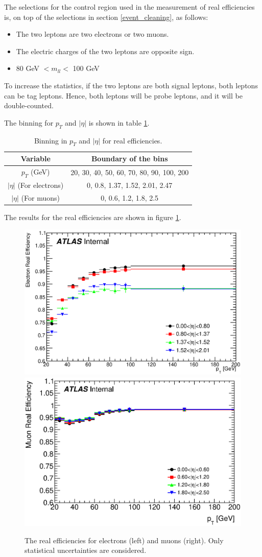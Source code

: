 The selections for the control region used in the measurement of real efficiencies is, on top of the selections in section \ref{event_cleaning}, as follows:
\begin{itemize}
\item The two leptons are two electrons or two muons.
\item The electric charges of the two leptons are opposite sign.
\item 80 GeV $< m_{ll} <$ 100 GeV
\end{itemize}

To increase the statistics, if the two leptons are both signal leptons, both leptons can be tag leptons.
Hence, both leptons will be probe leptons, and it will be double-counted.

The binning for $p_T$ and $|\eta|$ is shown in table \ref{tab:binning_real_eff}.
\begin{table}[htbp]
\centering
\begin{tabular}{|c|c|}
\hline
Variable & Boundary of the bins \\
\hline
$p_T$ (GeV) &  20, 30, 40, 50, 60, 70, 80, 90, 100, 200 \\
\hline
$|\eta|$ (For electrons) & 0, 0.8, 1.37, 1.52, 2.01, 2.47 \\
\hline
$|\eta|$ (For muons) & 0, 0.6, 1.2, 1.8, 2.5 \\
\hline
\end{tabular}
\caption{Binning in $p_T$ and $|\eta|$ for real efficiencies.}
\label{tab:binning_real_eff}
\end{table}

The results for the real efficiencies are shown in figure \ref{fig:result_real_eff}.
\begin{figure}[htpb]
\centering
\includegraphics[width=0.49\linewidth]{data/plot/plotRealEffs/El_hEff.eps}
\includegraphics[width=0.49\linewidth]{data/plot/plotRealEffs/Mu_hEff.eps}
\caption{The real efficiencies for electrons (left) and muons (right). Only statistical uncertainties are considered.}
\label{fig:result_real_eff}
\end{figure}

